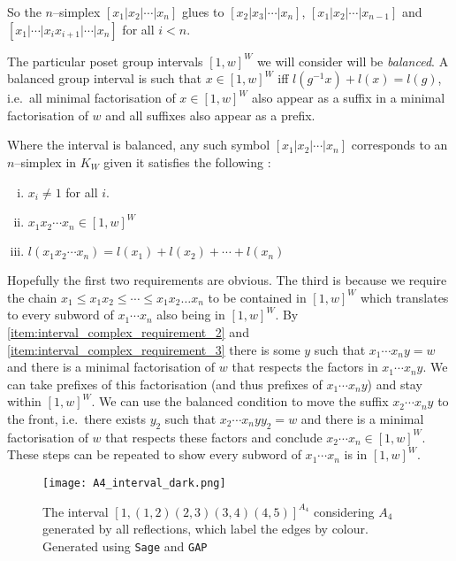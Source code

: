 \documentclass[class=article, crop=false]{standalone}
\begin{document}
So the $n$--simplex $[x_1 | x_2 | \cdots | x_n]$ glues to $[x_2|x_3|\cdots|x_n]$, $[x_1|x_2|\cdots|x_{n-1}]$ and \newline $[x_1| \cdots | x_ix_{i+1} | \cdots |x_n]$ for all $i<n$.

The particular poset group intervals $[1,w]^W$ we will consider will be \emph{balanced}. A balanced group interval is such that  $x \in [1,w]^W$ iff $l(g^{-1}x) + l(x) = l(g)$, i.e.~all minimal factorisation of $x \in [1,w]^W$ also appear as a suffix in a minimal factorisation of $w$ and all suffixes also appear as a prefix.

Where the interval is balanced, any such symbol  $[x_1 | x_2 | \cdots | x_n]$ corresponds to an $n$--simplex in $K_{W}$ given it satisfies the following \cite[Definition 2.8]{paolini_salvetti_kpi1_2021}:
\begin{enumerate}[i)]
    \item \label{item:interval_complex_requirement_1} $x_i \neq 1$ for all $i$.
    \item \label{item:interval_complex_requirement_2} $x_1 x_2 \cdots x_n \in [1,w]^W$
    \item \label{item:interval_complex_requirement_3} $l(x_1x_2\cdots x_n) = l(x_1) + l(x_2) + \cdots + l(x_n)$ 
\end{enumerate}

Hopefully the first two requirements are obvious. The third is because we require the chain $x_1 \leq x_1x_2 \leq \cdots \leq x_1x_2\ldots x_{n}$ to be contained in $[1,w]^W$ which translates to every subword of $x_1\cdots x_n$ also being in $[1,w]^W$. By \eqref{item:interval_complex_requirement_2} and \eqref{item:interval_complex_requirement_3} there is some $y$ such that $x_1 \cdots x_n y = w$ and there is a minimal factorisation of $w$ that respects the factors in $ x_1 \cdots x_n y$.
We can take prefixes of this factorisation (and thus prefixes of $ x_1 \cdots x_n y$) and stay within $[1,w]^W$. We can use the balanced condition to move the suffix $x_2\cdots x_n y$ to the front, i.e.~there exists $y_2$ such that $x_2\cdots x_n yy_2=w$ and there is a minimal factorisation of $w$ that respects these factors and conclude $x_2\cdots x_n \in [1,w]^W$. These steps can be repeated to show every subword of $x_1 \cdots x_n $ is in $[1,w]^W$.

\begin{figure}
	\centering
	\texttt{[image: A4\_interval\_dark.png]}
	\caption{The interval $[1, (1,2)(2,3)(3,4)(4,5)]^{A_4}$ considering $A_4$ generated by all reflections, which label the edges by colour. Generated using \texttt{Sage} and \texttt{GAP} \cite{sagemath_2020, gap_2022}}
	\label{fig:A4_interval}
\end{figure}
\end{document}
